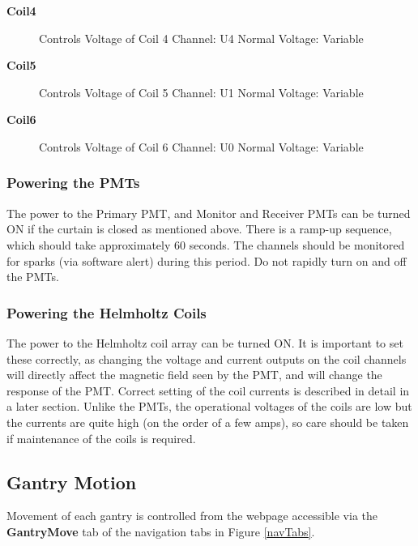 \documentclass[twoside,letterpaper]{refart}
\begin{document}
\begin{description}
	\item[\textbf{Coil4}] Controls Voltage of Coil 4\newline
	Channel:  U4 \newline
	Normal Voltage:  Variable
	
	\item[\textbf{Coil5}] Controls Voltage of Coil 5\newline
	Channel:  U1 \newline
	Normal Voltage:  Variable
	
	\item[\textbf{Coil6}] Controls Voltage of Coil 6\newline
	Channel:  U0 \newline
	Normal Voltage:  Variable
	
\end{description}

\subsubsection{Powering the PMTs}

The power to the Primary PMT, and Monitor and Receiver PMTs can be turned ON if the curtain is closed as mentioned above. There is a ramp-up sequence, which should take approximately 60 seconds.  The channels should be monitored for sparks (via software alert) during this period.  Do not rapidly turn on and off the PMTs.

\subsubsection{Powering the Helmholtz Coils}

The power to the Helmholtz coil array can be turned ON.  It is important to set these correctly, as changing the voltage and current outputs on the coil channels will directly affect the magnetic field seen by the PMT, and will change the response of the PMT. Correct setting of the coil currents is described in detail in a later section. Unlike the PMTs, the operational voltages of the coils are low but the currents are quite high (on the order of a few amps), so care should be taken if maintenance of the coils is required. 

\subsection{Gantry Motion}

Movement of each gantry is controlled from the webpage accessible via the \textbf{GantryMove} tab of the navigation tabs in Figure \ref{navTabs}. 
\end{document}
